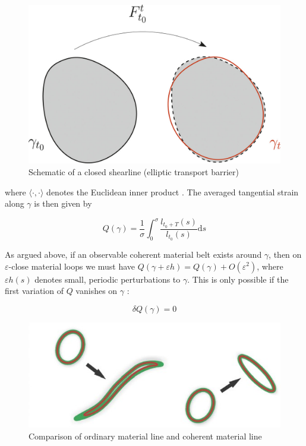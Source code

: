 \begin{figure}[ht]
  \centering
  \includegraphics[width=15cm]{chapter/figure/Schematics of a closed shearline.jpg}
  \caption
  {Schematic of a closed shearline (elliptic transport barrier) \cite{beron2013objective}
  }
\end{figure}

where $\langle\cdot, \cdot\rangle$ denotes the Euclidean inner product \cite{truesdell2004non}. The averaged tangential strain along $\gamma$ is then given by

\begin{equation}
    Q(\gamma)=\frac{1}{\sigma} \int_{0}^{\sigma} \frac{l_{t_0+T}(s)}{l_{t_{0}}(s)} \mathrm{d} s
\end{equation}


As argued above, if an observable coherent material belt exists around $\gamma$, then on $\varepsilon$-close material loops we must have $Q(\gamma+\varepsilon h)=Q(\gamma)+O\left(\varepsilon^{2}\right)$, where $\varepsilon h(s)$ denotes small, periodic perturbations to $\gamma$. This is only possible if the first variation of $Q$ vanishes on $\gamma$ :

\begin{equation}
  \delta Q(\gamma)=0
\end{equation}


\begin{figure}[ht]
  \centering
  \includegraphics[width=15cm]{chapter/figure/Haller_Beron-Vera_2013_Coherent Lagrangian vortices_Journal of Fluid Mechanics.jpg}
  \caption
  {Comparison of ordinary material line and coherent material line \cite{haller2013coherent}
  }
  \label{material line compare}
\end{figure}

